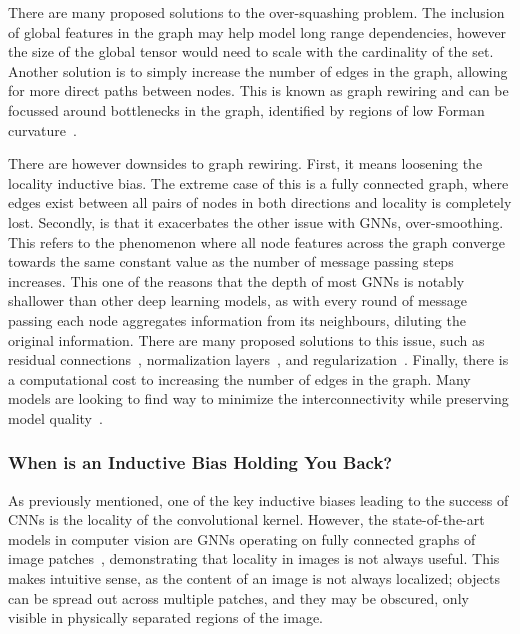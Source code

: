There are many proposed solutions to the over-squashing problem.
The inclusion of global features in the graph may help model long range dependencies, however the size of the global tensor would need to scale with the cardinality of the set.
Another solution is to simply increase the number of edges in the graph, allowing for more direct paths between nodes.
This is known as graph rewiring and can be focussed around bottlenecks in the graph, identified by regions of low Forman curvature~\cite{UnderstandingOversquashingBottlenecks}.

There are however downsides to graph rewiring.
First, it means loosening the locality inductive bias.
The extreme case of this is a fully connected graph, where edges exist between all pairs of nodes in both directions and locality is completely lost.
Secondly, is that it exacerbates the other issue with \Glspl{GNN}, over-smoothing.
This refers to the phenomenon where all node features across the graph converge towards the same constant value as the number of message passing steps increases.
This one of the reasons that the depth of most \Glspl{GNN} is notably shallower than other deep learning models, as with every round of message passing each node aggregates information from its neighbours, diluting the original information.
There are many proposed solutions to this issue, such as residual connections~\cite{DeepGCNs}, normalization layers~\cite{PairNorm}, and regularization~\cite{DirichletEnergyConstrained}.
Finally, there is a computational cost to increasing the number of edges in the graph.
Many models are looking to find way to minimize the interconnectivity while preserving model quality~\cite{GeneratingLongSequences}.

\subsubsection{When is an Inductive Bias Holding You Back?}

As previously mentioned, one of the key inductive biases leading to the success of \Glspl{CNN} is the locality of the convolutional kernel.
However, the state-of-the-art models in computer vision are \Glspl{GNN} operating on fully connected graphs of image patches~\cite{VisionTransformer}, demonstrating that locality in images is not always useful.
This makes intuitive sense, as the content of an image is not always localized; objects can be spread out across multiple patches, and they may be obscured, only visible in physically separated regions of the image.

